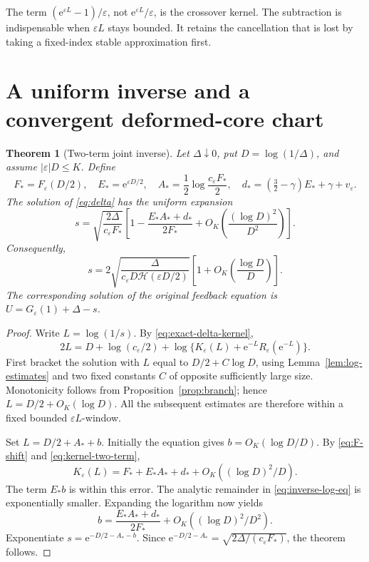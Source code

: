 \documentclass[11pt,a4paper]{article}
\numberwithin{equation}{section}
\newtheorem{theorem}{Theorem}[section]
\theoremstyle{definition}
\theoremstyle{remark}
\newcommand{\eps}{\varepsilon}
\newcommand{\ee}{\mathrm e}
\newcommand{\hc}{\mathcal H}
\newcommand{\FF}{F_{\eps}}
\newcommand{\KK}{K_{\eps}}
\begin{document}
The term \((\ee^{\eps L}-1)/\eps\), not \(\ee^{\eps L}/\eps\), is the
crossover kernel. The subtraction is indispensable when \(\eps L\) stays
bounded. It retains the cancellation that is lost by taking a fixed-index
stable approximation first.

\section{A uniform inverse and a convergent deformed-core chart}
\label{sec:inverse}

\begin{theorem}[Two-term joint inverse]
\label{thm:inverse}
Let \(\Delta\downarrow0\), put \(D=\log(1/\Delta)\), and assume
\(|\eps|D\le K\). Define
\begin{equation}
 F_*=\FF(D/2),\quad E_*=\ee^{\eps D/2},\quad
 A_* =\frac12\log\frac{c_{\eps}F_*}{2},\quad
 d_*=(\tfrac32-\gamma)E_*+\gamma+v_{\eps}.
 \label{eq:inverse-vars}
\end{equation}
The solution of \eqref{eq:delta} has the uniform expansion
\begin{equation}
 s=\sqrt{\frac{2\Delta}{c_{\eps}F_*}}
 \left[
 1-\frac{E_*A_*+d_*}{2F_*}
 +O_K\left(\frac{(\log D)^2}{D^2}\right)
 \right].
 \label{eq:inverse-two-term}
\end{equation}
Consequently,
\begin{equation}
 s=2\sqrt{\frac{\Delta}
 {c_{\eps}D\hc(\eps D/2)}}
 \left[1+O_K\left(\frac{\log D}{D}\right)\right].
 \label{eq:inverse-leading}
\end{equation}
The corresponding solution of the original feedback equation is
\(U=G_{\eps}(1)+\Delta-s\).
\end{theorem}
\begin{proof}
Write \(L=\log(1/s)\). By \eqref{eq:exact-delta-kernel},
\begin{equation}
 2L=D+\log(c_{\eps}/2)
 +\log\{\KK(L)+\ee^{-L}R_{\eps}(\ee^{-L})\}.
 \label{eq:inverse-log-eq}
\end{equation}
First bracket the solution with \(L\) equal to
\(D/2+C\log D\), using Lemma~\ref{lem:log-estimates} and two fixed constants
\(C\) of opposite sufficiently large size. Monotonicity follows from
Proposition~\ref{prop:branch}; hence \(L=D/2+O_K(\log D)\).
All the subsequent estimates are therefore within a fixed bounded
\(\eps L\)-window.

Set \(L=D/2+A_*+b\). Initially the equation gives
\(b=O_K(\log D/D)\). By \eqref{eq:F-shift} and
\eqref{eq:kernel-two-term},
\[
 \KK(L)=F_*+E_*A_*+d_*
       +O_K((\log D)^2/D).
\]
The term \(E_*b\) is within this error. The analytic remainder in
\eqref{eq:inverse-log-eq} is exponentially smaller. Expanding the logarithm
now yields
\[
 b=\frac{E_*A_*+d_*}{2F_*}
      +O_K((\log D)^2/D^2).
\]
Exponentiate \(s=\ee^{-D/2-A_*-b}\). Since
\(\ee^{-D/2-A_*}=\sqrt{2\Delta/(c_{\eps}F_*)}\), the theorem follows.
\end{proof}
\end{document}
